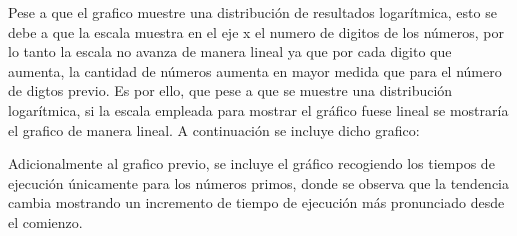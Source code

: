 Pese a que el grafico muestre una distribución de resultados logarítmica, esto se debe a que la escala muestra en el eje x el numero de digitos de los números, por lo tanto la escala no avanza de manera lineal ya que por cada digito que aumenta, la cantidad de números aumenta en mayor medida que para el número de digtos previo. Es por ello, que pese a que se muestre una distribución logarítmica, si la escala empleada para mostrar el gráfico fuese lineal se mostraría el grafico de manera lineal. A continuación se incluye dicho grafico:

\begin{figure}[H]
\end{figure}

Adicionalmente al grafico previo, se incluye el gráfico recogiendo los tiempos de ejecución únicamente para los números primos, donde se observa que la tendencia cambia mostrando un incremento de tiempo de ejecución más pronunciado desde el comienzo.
\begin{figure}[H]
\end{figure}


\newpage